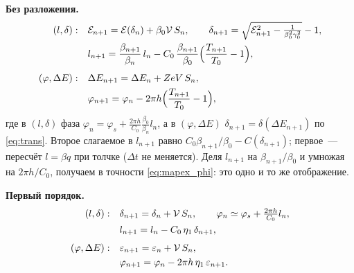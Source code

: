 \documentclass[a4paper,11pt]{article}
\numberwithin{equation}{section}
\newcommand{\cE}{\mathcal{E}}
\begin{document}
\medskip\noindent\textbf{Без разложения.}
\begin{align}
(l,\delta):\quad &\cE_{n+1}=\cE(\delta_n)+\beta_0\mathcal V\,S_n,\qquad \delta_{n+1}=\sqrt{\cE_{n+1}^2-\tfrac{1}{\beta_0^2\gamma_0^2}}-1, \notag\\
&l_{n+1}=\frac{\beta_{n+1}}{\beta_n}\,l_n-C_0\,\frac{\beta_{n+1}}{\beta_0}\Big(\frac{T_{n+1}}{T_0}-1\Big),
\label{eq:mapex_l}\\[4pt]
(\varphi,\Delta E):\quad &\Delta E_{n+1}=\Delta E_n+ZeV\,S_n, \notag\\
&\varphi_{n+1}=\varphi_n-2\pi h\Big(\frac{T_{n+1}}{T_0}-1\Big),
\label{eq:mapex_phi}
\end{align}
где в $(l,\delta)$ фаза $\varphi_n=\varphi_s+\frac{2\pi h}{C_0}\frac{\beta_0}{\beta_n}l_n$, а в $(\varphi,\Delta E)$ $\delta_{n+1}=\delta(\Delta E_{n+1})$
по \eqref{eq:trans}. Второе слагаемое в $l_{n+1}$ равно $C_0\beta_{n+1}/\beta_0-C(\delta_{n+1})$; первое~--- пересчёт
$l=\beta q$ при толчке ($\Delta t$ не меняется). Деля $l_{n+1}$ на $\beta_{n+1}/\beta_0$ и умножая на $2\pi h/C_0$,
получаем в точности \eqref{eq:mapex_phi}: это одно и то же отображение.

\medskip\noindent\textbf{Первый порядок.}
\begin{align}
(l,\delta):\quad &\delta_{n+1}=\delta_n+\mathcal V\,S_n,\qquad \varphi_n\simeq\varphi_s+\tfrac{2\pi h}{C_0}l_n, \notag\\
&l_{n+1}=l_n-C_0\,\eta_1\,\delta_{n+1}, \label{eq:map1}\\[4pt]
(\varphi,\Delta E):\quad &\varepsilon_{n+1}=\varepsilon_n+\mathcal V\,S_n, \notag\\
&\varphi_{n+1}=\varphi_n-2\pi h\,\eta_1\,\varepsilon_{n+1}. \label{eq:map1phi}
\end{align}
\end{document}
